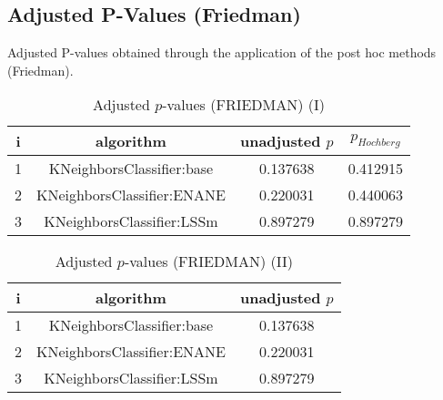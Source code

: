 \documentclass[a4paper,10pt]{article}
\begin{document}
\begin{landscape}
\section{Adjusted P-Values (Friedman)}


Adjusted P-values obtained through the application of the post hoc methods (Friedman).

\begin{table}[!htp]
\centering\small
\begin{tabular}{cccc}
i&algorithm&unadjusted $p$&$p_{Hochberg}$\\
\hline1&KNeighborsClassifier:base&0.137638&0.412915\\2&KNeighborsClassifier:ENANE&0.220031&0.440063\\3&KNeighborsClassifier:LSSm&0.897279&0.897279\\\hline
\end{tabular}
\caption{Adjusted $p$-values (FRIEDMAN) (I)}
\end{table}
\begin{table}[!htp]
\centering\small
\begin{tabular}{ccc}
i&algorithm&unadjusted $p$\\
\hline1&KNeighborsClassifier:base&0.137638\\2&KNeighborsClassifier:ENANE&0.220031\\3&KNeighborsClassifier:LSSm&0.897279\\\hline
\end{tabular}
\caption{Adjusted $p$-values (FRIEDMAN) (II)}
\end{table}

\newpage
\end{landscape}
\end{document}

